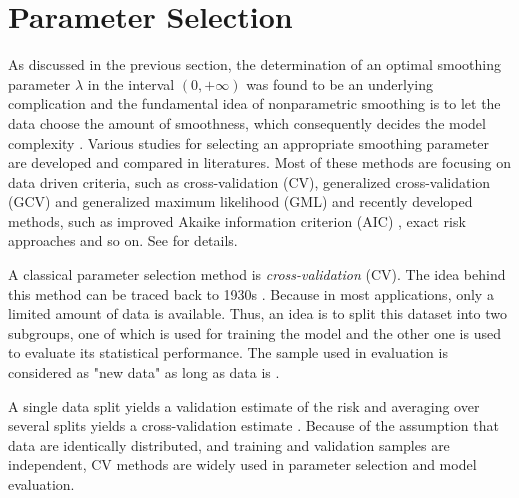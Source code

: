 \section{Parameter Selection}

As discussed in the previous section, the determination of an optimal smoothing parameter $\lambda$ in the interval $(0,+\infty)$ was found to be an underlying complication and the fundamental idea of nonparametric smoothing is to let the data choose the amount of smoothness, which consequently decides the model complexity \citep{gu1998model}. Various studies for selecting an appropriate smoothing parameter are developed and compared in literatures. Most of these methods are focusing on data driven criteria, such as cross-validation (CV), generalized cross-validation (GCV) \citep{craven1978smoothing} and generalized maximum likelihood (GML) \citep{wahba1985comparison} and recently developed methods, such as improved Akaike information criterion (AIC) \citep{hurvich1998smoothing}, exact risk approaches \citep{wand1997exact} and so on. See \eg \citep{craven1978smoothing, hardle1988far, hardle1990applied, wahba1990spline, green1993nonparametric, cantoni2001resistant, aydin2013smoothing} for details.  



A classical parameter selection method is \textit{cross-validation} (CV). The idea behind this method can be traced back to 1930s \citep{larson1931shrinkage}. Because in most applications, only a limited amount of data is available. Thus, an idea is to split this dataset into two subgroups, one of which is used for training the model and the other one is used to evaluate its statistical performance. The sample used in evaluation is considered as "new data" as long as data is \iid. 

A single data split yields a validation estimate of the risk and averaging over several splits yields a cross-validation estimate \citep{arlot2010survey}. Because of the assumption that data are identically distributed, and training and validation samples are independent, CV methods are widely used in parameter selection and model evaluation. 



